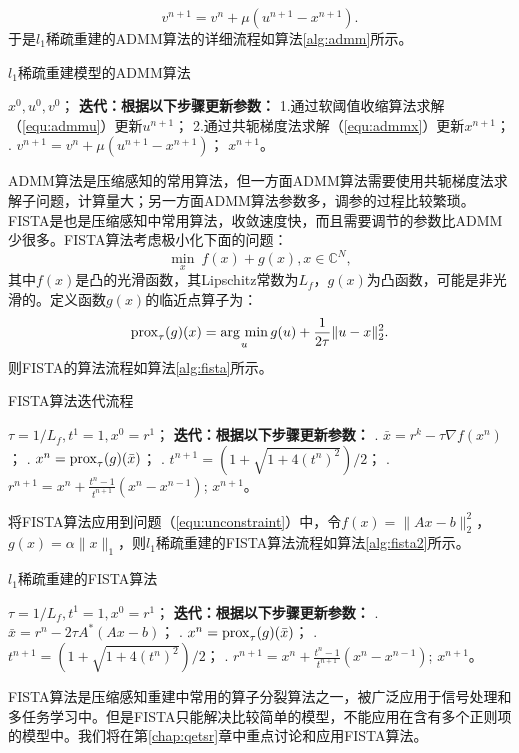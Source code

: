 \begin{equation}
	v^{n+1}=v^{n}+\mu(u^{n+1}-x^{n+1}).
\end{equation}
于是$l_1$稀疏重建的ADMM算法的详细流程如算法\ref{alg:admm}所示。
\begin{algorithm}
	\caption{$l_1$稀疏重建模型的ADMM算法}
	\label{alg:admm}
	\begin{algorithmic}
		\REQUIRE $x^0, u^0, v^0$；
		\INDSTATE[-1.25] \textbf{迭代：根据以下步骤更新参数：}	
		\STATE 1.通过软阈值收缩算法求解（\ref{equ:admmu}）更新$u^{n+1}$；
		\STATE 2.通过共轭梯度法求解（\ref{equ:admmx}）更新$x^{n+1}$；
		. $v^{n+1}=v^{n}+\mu(u^{n+1}-x^{n+1})$；
		\ENSURE $x^{n+1}$。
	\end{algorithmic}
\end{algorithm}

ADMM算法是压缩感知的常用算法，但一方面ADMM算法需要使用共轭梯度法求解子问题，计算量大；另一方面ADMM算法参数多，调参的过程比较繁琐。FISTA\cite{fista}是也是压缩感知中常用算法，收敛速度快，而且需要调节的参数比ADMM少很多。FISTA算法考虑极小化下面的问题：
\begin{equation}
	\min_x\ f(x)+g(x),x\in \mathbb{C}^N,
\end{equation}
其中$f(x)$是凸的光滑函数，其Lipschitz常数为$L_f$，$g(x)$为凸函数，可能是非光滑的。定义函数$g(x)$的临近点算子为：
\begin{equation}
	\mathrm{prox}_\tau(g)(x)=\argmin_u g(u)+\frac{1}{2\tau}\|u-x\|^2_2.
\end{equation}
则FISTA的算法流程如算法\ref{alg:fista}所示。
\begin{algorithm}
	\caption{FISTA算法迭代流程}
	\label{alg:fista}
	\begin{algorithmic}
		\REQUIRE $\tau = 1/L_f, t^1=1, x^0=r^1$；
		\INDSTATE[-1.25] \textbf{迭代：根据以下步骤更新参数：}	
		. $\bar{x}=r^k-\tau\nabla f(x^n)$；
		. $x^n=\mathrm{prox}_{\tau}(g)(\bar{x})$；
		. $t^{n+1}=(1+\sqrt{1+4(t^n)^2})/2$；
		. $r^{n+1}=x^n+\frac{t^n-1}{t^{n+1}}(x^n-x^{n-1})$;
		\ENSURE $x^{n+1}$。
	\end{algorithmic}
\end{algorithm}

将FISTA算法应用到问题（\ref{equ:unconstraint}）中，令$f(x)=\|Ax-b\|^2_2$，$g(x)=\alpha\|x\|_1$，则$l_1$稀疏重建的FISTA算法流程如算法\ref{alg:fista2}所示。
\begin{algorithm}
	\caption{$l_1$稀疏重建的FISTA算法}
	\label{alg:fista2}
	\begin{algorithmic}
		\REQUIRE $\tau = 1/L_f, t^1=1, x^0=r^1$；
		\INDSTATE[-1.25] \textbf{迭代：根据以下步骤更新参数：}	
		. $\bar{x}=r^n-2\tau A^*(Ax-b)$；
		. $x^n=\mathrm{prox}_{\tau}(g)(\bar{x})$；
		. $t^{n+1}=(1+\sqrt{1+4(t^n)^2})/2$；
		. $r^{n+1}=x^n+\frac{t^n-1}{t^{n+1}}(x^n-x^{n-1})$;
		\ENSURE $x^{n+1}$。
	\end{algorithmic}
\end{algorithm}
FISTA算法是压缩感知重建中常用的算子分裂算法之一，被广泛应用于信号处理\cite{beck2009fast}和多任务学习\cite{ji2009accelerated}中。但是FISTA只能解决比较简单的模型，不能应用在含有多个正则项的模型中。我们将在第\ref{chap:qetsr}章中重点讨论和应用FISTA算法。

